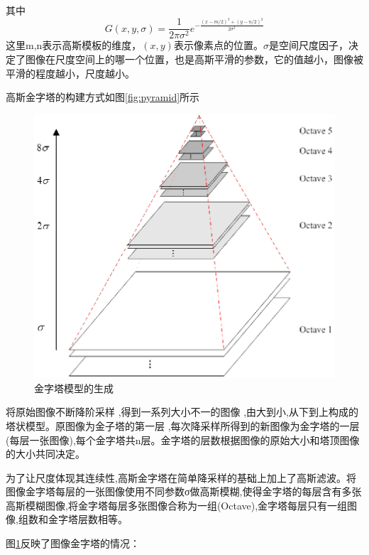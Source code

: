 其中
\begin{equation}
  G(x,y,\sigma) = \frac{1}{2\pi\sigma^2}e^{-\frac{(x-m/2)^2+(y-n/2)^2}{2\sigma ^2}}
\end{equation}
这里m,n表示高斯模板的维度，\((x,y)\)表示像素点的位置。\(\sigma\)是空间尺度因子，决定了图像在尺度空间上的哪一个位置，也是高斯平滑的参数，它的值越小，图像被平滑的程度越小，尺度越小。

高斯金字塔的构建方式如图\ref{fig:pyramid}所示

\begin{figure}
\centering\includegraphics[width=15cm]{imgs/ch2/pyramid}
\caption{金字塔模型的生成}
\label{fig:DoG}
\end{figure}

将原始图像不断降阶采样 ,得到一系列大小不一的图像 ,由大到小,从下到上构成的塔状模型。原图像为金子塔的第一层 ,每次降采样所得到的新图像为金字塔的一层(每层一张图像),每个金字塔共n层。金字塔的层数根据图像的原始大小和塔顶图像的大小共同决定。

为了让尺度体现其连续性,高斯金字塔在简单降采样的基础上加上了高斯滤波。将图像金字塔每层的一张图像使用不同参数σ做高斯模糊,使得金字塔的每层含有多张高斯模糊图像,将金字塔每层多张图像合称为一组(Octave),金字塔每层只有一组图像,组数和金字塔层数相等。

图\ref{fig:DoG}反映了图像金字塔的情况：

